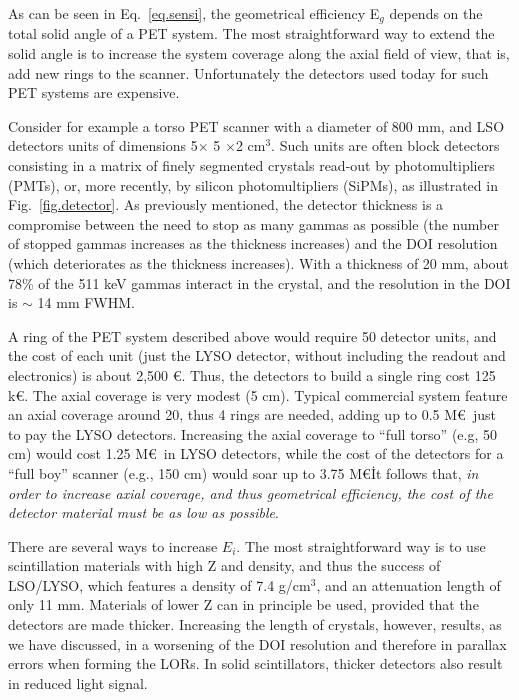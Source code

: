 As can be seen in Eq.~\ref{eq.sensi}, the geometrical efficiency E$_g$ depends on the total solid angle of a PET system.  The most straightforward way to extend the solid angle is to increase the system
coverage along the axial field of view, that is, add new rings to the scanner. Unfortunately the detectors used today for such PET systems are expensive.

Consider for example a torso PET scanner with a diameter of 800 mm, and LSO detectors units of dimensions 5$\times$ 5 $\times $2 cm$^3$. Such units are often block detectors consisting in a matrix of finely segmented crystals read-out by photomultipliers (PMTs), or, more recently, by silicon photomultipliers (SiPMs), as illustrated in Fig.~\ref{fig.detector}. As previously mentioned, the detector thickness is a compromise between the need to stop as many gammas as possible (the number of stopped gammas increases as the thickness increases) and the DOI resolution (which deteriorates as the thickness increases). With a thickness of 20 mm, about 78\% of the 511 keV gammas interact in the crystal, and the resolution in the DOI is  $\sim$ 14 mm FWHM.  


A ring of the PET system described above would require 50 detector units, and the cost of each unit (just the LYSO detector, without including the readout and electronics) is about 2,500 \euro. Thus, the detectors to build a single ring cost 125 k\euro. The axial coverage is very modest (5 cm). Typical commercial system feature an axial coverage around 20, thus 4 rings are needed,  adding up to 0.5 M\euro\ just to pay the LYSO detectors. Increasing the axial coverage to ``full torso'' (e.g, 50 cm) would cost 1.25 M\euro\ in LYSO detectors, while the cost of the detectors for a ``full boy'' scanner (e.g., 150 cm) would soar up to 3.75 M\euro\. It follows that, {\em in order to increase axial coverage, and thus geometrical efficiency, the cost of the detector material must be as low as possible}.

There are several ways to increase $E_i$.
The most straightforward way is to use scintillation
materials with high Z and density, and thus the success of LSO/LYSO, which features a density of 7.4 g/cm$^3$, and an attenuation length of only 11 mm. Materials of lower Z can in principle be used, provided that the detectors are made thicker. Increasing the length of crystals, however, results, as we have discussed, in a worsening of the DOI resolution and therefore in parallax errors when forming the LORs. In solid scintillators, thicker detectors also result in reduced light signal. 

